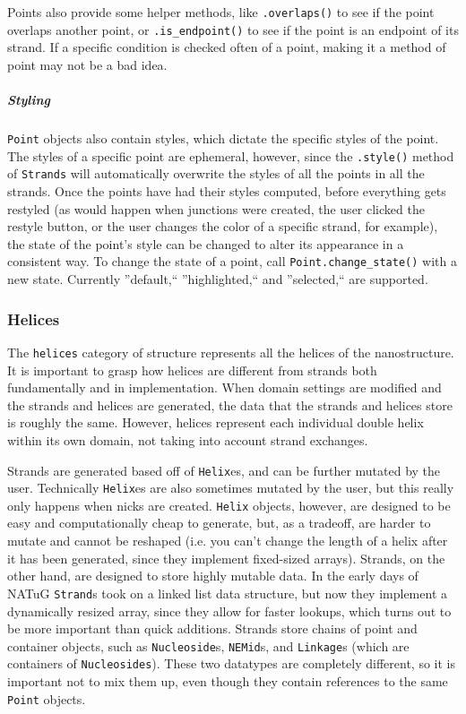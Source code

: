 \documentclass[titlepage]{article}
\begin{document}
	Points also provide some helper methods, like \texttt{.overlaps()} to see if the point overlaps another point, or \texttt{.is\_endpoint()} to see if the point is an endpoint of its strand. If a specific condition is checked often of a point, making it a method of point may not be a bad idea.
	
	\subparagraph{Styling}
	\texttt{Point} objects also contain styles, which dictate the specific styles of the point. The styles of a specific point are ephemeral, however, since the \texttt{.style()} method of \texttt{Strands} will automatically overwrite the styles of all the points in all the strands. Once the points have had their styles computed, before everything gets restyled (as would happen when junctions were created, the user clicked the restyle button, or the user changes the color of a specific strand, for example), the state of the point's style can be changed to alter its appearance in a consistent way. To change the state of a point, call \texttt{Point.change\_state()} with a new state. Currently ''default,`` ''highlighted,`` and ''selected,`` are supported.
	
	\subsubsection{Helices}
	The \texttt{helices} category of structure represents all the helices of the nanostructure. It is important to grasp how helices are different from strands both fundamentally and in implementation. When domain settings are modified and the strands and helices are generated, the data that the strands and helices store is roughly the same. However, helices represent each individual double helix within its own domain, not taking into account strand exchanges.
	
	Strands are generated based off of \texttt{Helix}es, and can be further mutated by the user. Technically \texttt{Helix}es are also sometimes mutated by the user, but this really only happens when nicks are created. \texttt{Helix} objects, however, are designed to be easy and computationally cheap to generate, but, as a tradeoff, are harder to mutate and cannot be reshaped (i.e. you can't change the length of a helix after it has been generated, since they implement fixed-sized arrays). Strands, on the other hand, are designed to store highly mutable data. In the early days of NATuG \texttt{Strand}s took on a linked list data structure, but now they implement a dynamically resized array, since they allow for faster lookups, which turns out to be more important than quick additions. Strands store chains of point and container objects, such as \texttt{Nucleoside}s, \texttt{NEMid}s, and \texttt{Linkage}s (which are containers of \texttt{Nucleosides}). These two datatypes are completely different, so it is important not to mix them up, even though they contain references to the same \texttt{Point} objects.
	
\end{document}
